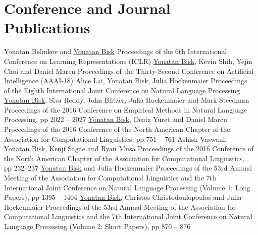 \documentclass[10pt,letter]{moderncv}
\newcommand{\YB}{\underline{Yonatan Bisk}}
\begin{document}
\section{Conference and Journal Publications}
  {\href{https://arxiv.org/abs/1711.02173}{\color{linkcolor}{Synthetic and Natural Noise Both Break Neural Machine Translation}}}
  {Yonatan Belinkov and \YB{}}
  {Proceedings of the 6th International Conference on Learning Representations (ICLR)}{}{}
\pub{--}
  {\href{http://yonatanbisk.com/papers/2018-AAAI.pdf}{\color{linkcolor}{Learning Interpretable Spatial Operations in a Rich 3D Blocks World}}}
  {\YB{}, Kevin Shih, Yejin Choi and Daniel Marcu}
  {Proceedings of the Thirty-Second Conference on Artificial Intelligence (AAAI-18) }{}{}
  {\href{https://arxiv.org/abs/1710.02925}{\color{linkcolor}{Natural Language Inference from Multiple Premises}}}
  {Alice Lai, \YB{}, Julia Hockenmaier}
  {Proceedings of the Eighth International Joint Conference on Natural Language Processing}{}{}
  {\href{http://yonatanbisk.com/papers/2016-EMNLP.pdf}{\color{linkcolor}{Evaluating Induced CCG Parsers on Grounded Semantic Parsing}}}
{\YB{}, Siva Reddy, John Blitzer, Julia Hockenmaier and Mark Steedman}
  {Proceedings of the 2016 Conference on Empirical Methods in Natural Language Processing, pp 2022 -- 2027}{}{}
\pub{--}
  {\href{http://yonatanbisk.com/papers/2016-NAACL.pdf}{\color{linkcolor}{Natural Language Communication with Robots}}}
  {\YB{}, Deniz Yuret and Daniel Marcu}
  {Proceedings of the 2016 Conference of the North American Chapter of the Association for Computational Linguistics, pp 751 -- 761}{}{}
\pub{--}
  {\href{http://yonatanbisk.com/papers/2016-NAACLShort.pdf}{\color{linkcolor}{Supertagging With LSTMs}}}
  {Ashish Vaswani, \YB, Kenji Sagae and Ryan Musa}
  {Proceedings of the 2016 Conference of the North American Chapter of the Association for Computational Linguistics, pp 232--237}{}{}
  {\href{http://yonatanbisk.com/papers/2015-ACL.pdf}{\color{linkcolor}{Probing the Linguistic Strengths and Limitations of Unsupervised Grammar Induction}}}
  {\YB{} and Julia Hockenmaier}
  {Proceedings of the 53rd Annual Meeting of the Association for Computational Linguistics and the 7th International Joint Conference on Natural Language Processing (Volume 1: Long Papers), pp 1395 -- 1404 }{}{}
\pub{--}
  {\href{http://yonatanbisk.com/papers/2015-ACLShort-Fixed.pdf}{\color{linkcolor}{Labeled Grammar Induction with Minimal Supervision}}}
  {\YB, Christos Christodoulopoulos and Julia Hockenmaier}
  {Proceedings of the 53rd Annual Meeting of the Association for Computational Linguistics and the 7th International Joint Conference on Natural Language Processing (Volume 2: Short Papers), pp 870 -- 876 }{}{}
\end{document}

